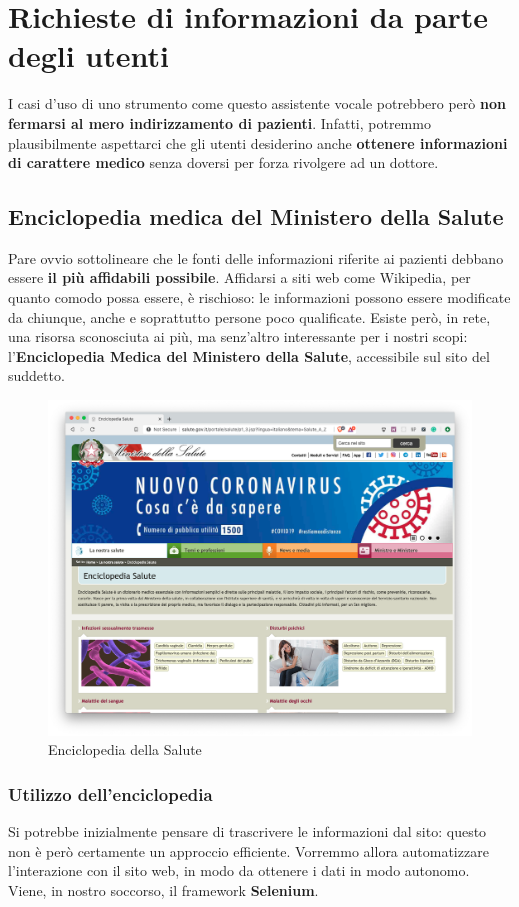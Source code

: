 \chapter{Richieste di informazioni da parte degli utenti}
\label{chap:informations}
I casi d'uso di uno strumento come questo assistente vocale potrebbero però \textbf{non fermarsi al mero indirizzamento di pazienti}. Infatti, potremmo plausibilmente aspettarci che gli utenti desiderino anche \textbf{ottenere informazioni di carattere medico} senza doversi per forza rivolgere ad un dottore.
\section{Enciclopedia medica del Ministero della Salute}
Pare ovvio sottolineare che le fonti delle informazioni riferite ai pazienti debbano essere \textbf{il più affidabili possibile}. Affidarsi a siti web come Wikipedia, per quanto comodo possa essere, è rischioso: le informazioni possono essere modificate da chiunque, anche e soprattutto persone poco qualificate.
Esiste però, in rete, una risorsa sconosciuta ai più, ma senz'altro interessante per i nostri scopi: l'\textbf{Enciclopedia Medica del Ministero della Salute}, accessibile sul sito del suddetto.
\begin{figure}[h]
    \begin{center}
        \includegraphics[width=0.8\columnwidth]{images/informations/MinSalute.png}
    \end{center}
    \caption{Enciclopedia della Salute}
    \label{fig:min-salute}
\end{figure}
\subsection{Utilizzo dell'enciclopedia}
Si potrebbe inizialmente pensare di trascrivere le informazioni dal sito: questo non è però certamente un approccio efficiente. Vorremmo allora automatizzare l'interazione con il sito web, in modo da ottenere i dati in modo autonomo. Viene, in nostro soccorso, il framework \textbf{Selenium}.
